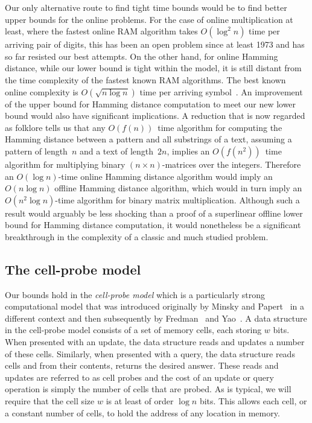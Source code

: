 \documentclass{toc}
\begin{document}
Our only alternative route to find tight time bounds would be to find better upper bounds for the online problems. For the case of online multiplication at least, where the fastest online RAM algorithm takes $O(\log^2{n})$ time per arriving pair of digits, this has been an open problem since at least 1973 and has so far resisted our best attempts.
%
%
%
On the other hand, for online Hamming distance, while our lower bound is tight within the model, it is still distant from the time complexity of the fastest known RAM algorithms. The best known online complexity is $O(\sqrt{n\log{n}})$ time per arriving symbol~\cite{CEPP:2011}. An improvement of the upper bound for Hamming  distance computation to meet our new lower bound would also have significant implications. A reduction that is now regarded as folklore tells us that any $O(f(n))$~time algorithm for computing the Hamming distance between a pattern and all substrings of a text, assuming a pattern of length~$n$ and a text of length~$2n$, implies an $O(f(n^2))$~time algorithm for multiplying binary $(n\!\times\! n)$-matrices over the integers. Therefore an
%
$O(\log{n})$-time    %
online Hamming distance algorithm would imply an $O(n\log{n})$  offline Hamming distance algorithm, which would in turn imply an
%
$O(n^2\log{n})$-time     %
algorithm for binary matrix multiplication.  Although such a result would arguably be less shocking than a proof of a superlinear offline lower bound for Hamming distance computation, it would nonetheless be a significant breakthrough in the complexity of a classic and much studied problem.




\subsection{The cell-probe model}

Our bounds hold in the \emph{cell-probe model} which is a particularly strong computational model that was introduced originally by Minsky and Papert~\cite{MP:1969} in a different context and then subsequently by Fredman~\cite{Fredman:1978} and Yao~\cite{Yao1981:Tables}. A data structure in the cell-probe model consists of a set of memory cells, each storing $w$ bits. When presented with an update, the data structure reads and updates a number of these cells. Similarly, when presented with a query, the data structure reads cells and from their contents, returns the desired answer. These reads and updates are referred to as cell probes and the cost of an update or query operation is simply the number of cells that are probed. As is typical, we will require that the cell size $w$ is at least of order $\log n$ bits. This allows each cell, or a constant number of cells, to hold the address of any location in memory.
\end{document}
